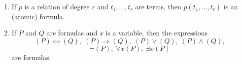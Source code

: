 \begin{enumerate}
\item[(a)] If $p$ is a relation of degree $r$ and $t_1, \ldots, t_r$ are terms, then $p(t_1, \ldots, t_r)$ is an (atomic) formula.
\item[(b)] If $P$ and $Q$ are formulas and $x$ is a variable, then the expressions
$$(P) \Leftrightarrow (Q),\; (P) \Rightarrow (Q),\; (P) \vee (Q),\; (P) \wedge (Q),$$
$$\neg(P),\; \forall x(P),\; \exists x(P)$$
are formulas.
\end{enumerate}

